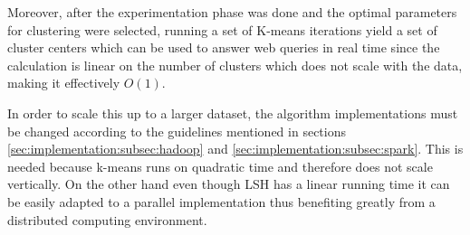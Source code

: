 \documentclass[10pt,a4paper]{scrartcl}
\begin{document}
      Moreover, after the experimentation phase was done and the optimal
      parameters for clustering were selected, running a set of K-means
      iterations yield a set of cluster centers which can be used to answer
      web queries in real time since the calculation is linear on the number
      of clusters which does not scale with the data, making it effectively
      $O(1)$.
      
      In order to scale this up to a larger dataset, the algorithm
      implementations must be changed according to the guidelines mentioned
      in sections \ref{sec:implementation:subsec:hadoop} and
      \ref{sec:implementation:subsec:spark}. This is needed because
      k-means runs on quadratic time and therefore does not scale vertically.
      On the other hand even though LSH has a linear running time
      it can be easily adapted to a parallel implementation
      thus benefiting greatly from a distributed computing environment.
      
  
  
\end{document}
